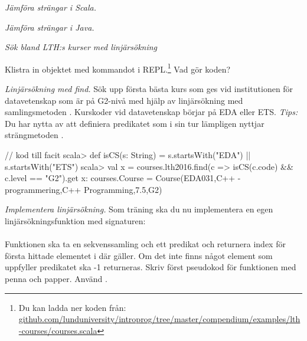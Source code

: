 

\Exercise{\ExeWeekTEN}

\begin{Goals}
\item 
\end{Goals}

\begin{Preparations}
\item 
\end{Preparations}

\BasicTasks %

\Task \emph{Jämföra strängar i Scala.}


\Task \emph{Jämföra strängar i Java.}


\Task \emph{Sök bland LTH:s kurser med linjärsökning} 

\Subtask \label{subtask:download-lthcourses} Klistra in objektet  med kommandot  i REPL.\footnote{Du kan ladda ner koden från: \\ \href{https://raw.githubusercontent.com/lunduniversity/introprog/master/compendium/examples/lth-courses/courses.scala}{github.com/lunduniversity/introprog/tree/master/compendium/examples/lth-courses/courses.scala}} Vad gör koden?


\Subtask \emph{Linjärsökning med find.} Sök upp första bästa kurs som ges vid institutionen för datavetenskap som är på G2-nivå med hjälp av linjärsökning med samlingsmetoden . Kurskoder vid datavetenskap börjar på EDA eller ETS. \emph{Tips:} Du har nytta av att definiera predikatet  som i sin tur lämpligen nyttjar strängmetoden .

\begin{REPL}
// kod till facit
scala> def isCS(s: String) = s.startsWith("EDA") || s.startsWith("ETS")
scala> val x = courses.lth2016.find(c => isCS(c.code) && c.level == "G2").get
x: courses.Course = Course(EDA031,C++ - programmering,C++ Programming,7.5,G2)
\end{REPL}

\Subtask \emph{Implementera linjärsökning.} Som träning ska du nu implementera en egen linjärsökningsfunktion med signaturen: \\ 
\\ Funktionen ska ta en sekvenssamling  och ett predikat  och returnera index för första hittade elementet i  där  gäller. Om det inte finns något element som uppfyller predikatet ska -1 returneras. Skriv först pseudokod för funktionen med penna och papper. Använd . 


